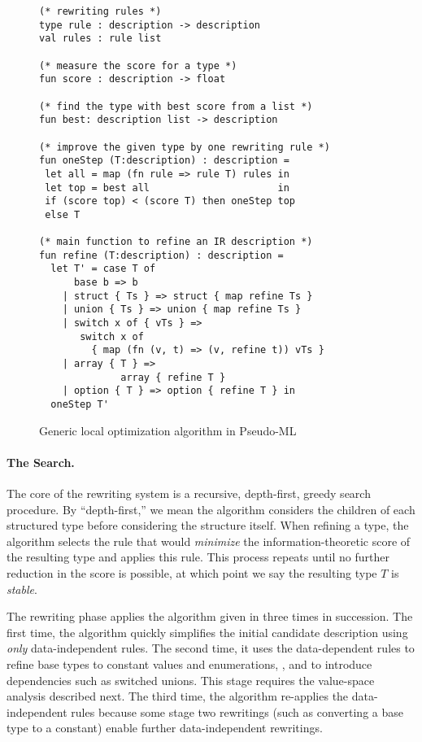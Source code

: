 \begin{figure}[bht]
{\small 
\begin{verbatim}
(* rewriting rules *)
type rule : description -> description  
val rules : rule list 

(* measure the score for a type *)
fun score : description -> float

(* find the type with best score from a list *)
fun best: description list -> description

(* improve the given type by one rewriting rule *)
fun oneStep (T:description) : description =
 let all = map (fn rule => rule T) rules in
 let top = best all                      in
 if (score top) < (score T) then oneStep top
 else T

(* main function to refine an IR description *) 
fun refine (T:description) : description =
  let T' = case T of
      base b => b
    | struct { Ts } => struct { map refine Ts }
    | union { Ts } => union { map refine Ts }
    | switch x of { vTs } => 
       switch x of 
         { map (fn (v, t) => (v, refine t)) vTs }
    | array { T } => 
              array { refine T }
    | option { T } => option { refine T } in
  oneStep T'
\end{verbatim}
}
\caption{Generic local optimization algorithm in Pseudo-ML} \shrink
\label{fig:refinement}
\end{figure}

\paragraph*{The Search.}
The core of the rewriting system is 
a recursive, depth-first, greedy search procedure. 
By ``depth-first,'' we mean the algorithm considers the 
children of each structured type before considering
the structure itself. When refining a type, the algorithm selects the rule that 
would {\em minimize} the information-theoretic score of the resulting
type and applies this rule.  This process repeats  until
no further reduction in the score is possible, at
which point we say the resulting type $T$ is {\em stable}.

The rewriting phase applies the
algorithm given in  three
times in succession. 
The first time, the algorithm quickly simplifies the initial candidate
description using {\em only} data-independent rules. The second time,
it uses the data-dependent 
rules to refine base types to constant values and enumerations, \etc{},
and to introduce dependencies such as switched unions. This stage
requires the value-space analysis described next.
The third time, the algorithm re-applies the data-independent rules
because some stage two rewritings (such as converting a base type to a
constant) enable further data-independent rewritings.

